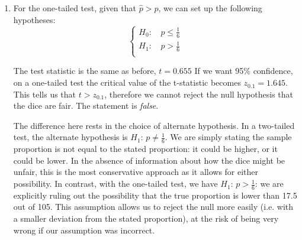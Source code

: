 \documentclass[a4paper, leqno, 12pt]{article} %
\newenvironment{top_enumerate}{
\begin{enumerate}
  \setlength{\itemsep}{2em}
  \setlength{\topsep}{-0pt}
  \setlength{\partopsep}{-0pt}
}{\end{enumerate}}
\begin{document}
\begin{top_enumerate}
\begin{enumerate}
	The test statistic is:
	\[
	t = \frac{\hat p - p}{\frac{\sigma}{\sqrt{n}}} = \frac{{0.190}-\frac{1}{6}}{\sqrt{\frac{5}{36\times{105}}}} = \frac{{0.024}}{{0.036}} = {0.655}
	\]
	
	Given that we want 95\% confidence on a two-tailed test with a sample size of $n={105}$, the critical value of the t-statistic is $z_{0.05} = 1.96$. This tells us that $t < z_{0.02}$, therefore there is { not }enough evidence to reject the null hypothesis that the dice are fair. The statement is \emph{{false}}.
	 \quad \textbf{}
		\item For the one-tailed test, given that $\hat p > p$, we can set up the following hypotheses:
	\[
	\left\{\begin{aligned}
	H_0: \, & p \le \frac{1}{6} \\
	H_1: \, & p > \frac{1}{6} \\
	\end{aligned}\right.
	\]
	
	The  test statistic is the same as before, $t = {0.655}$ If we want 95\% confidence, on a one-tailed test the critical value of the t-statistic becomes $z_{0.1} = 1.645$. This tells us that $t > z_{0.1}$, therefore we { cannot }reject the null hypothesis that the dice are fair. The statement is \emph{{false}}.
	
	The difference here rests in the choice of alternate hypothesis. In a two-tailed test, the alternate hypothesis is $H_1: \, p \ne \frac{1}{6}$. We are simply stating the sample proportion is not equal to the stated proportion: it could be higher, or it could be lower. In the absence of information about how the dice might be unfair, this is the most conservative approach as it allows for either possibility. In contrast, with the one-tailed test, we have $H_1: \, p > \frac{1}{6}$: we are explicitly ruling out the possibility that the true proportion is lower than {17.5} out of {105}. This assumption allows us to reject the null more easily (i.e. with a smaller deviation from the stated proportion), at the risk of being very wrong if our assumption was incorrect.
	

\end{enumerate}
\end{top_enumerate}
\end{document}
